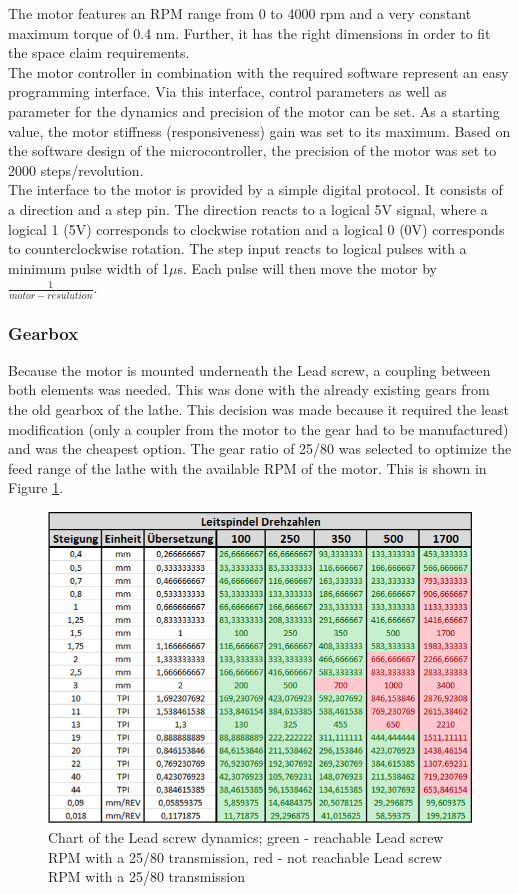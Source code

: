 The motor features an RPM range from 0 to 4000 rpm and a very constant maximum torque of 0.4 nm. Further, it has the right dimensions in order to fit the space claim requirements.\\
The motor controller in combination with the required software represent an easy programming interface. Via this interface, control parameters as well as parameter for the dynamics and precision of the motor can be set. As a starting value, the motor stiffness (responsiveness) gain was set to its maximum. Based on the software design of the microcontroller, the precision of the motor was set to 2000 steps/revolution.\\
The interface to the motor is provided by a simple digital protocol. It consists of a direction and a step pin. The direction reacts to a logical 5V signal, where a logical 1 (5V) corresponds to clockwise rotation and a logical 0 (0V) corresponds to counterclockwise rotation. The step input reacts to logical pulses with a minimum pulse width of 1$\mu$s. Each pulse will then move the motor by $\frac{1}{motor-resulution}$.
 
\subsubsection{Gearbox}
Because the motor is mounted underneath the Lead screw, a coupling between both elements was needed. This was done with the already existing gears from the old gearbox of the lathe. This decision was made because it required the least modification (only a coupler from the motor to the gear had to be manufactured) and was the cheapest option. The gear ratio of 25/80 was selected to optimize the feed range of the lathe with the available RPM of the motor. This is shown in Figure \ref{Chart Leadscrew Dynamics}.
 
\begin{figure}
    \begin{center}
    \includegraphics[width=12cm]{Pictures/TransmissionDynamics.png}
    \caption[Chart of the Lead screw dynamics]{Chart of the Lead screw dynamics; green - reachable Lead screw RPM with a 25/80 transmission, red - not reachable Lead screw RPM with a 25/80 transmission}
    \label{Chart Leadscrew Dynamics}
    \end{center}
\end{figure}
 
